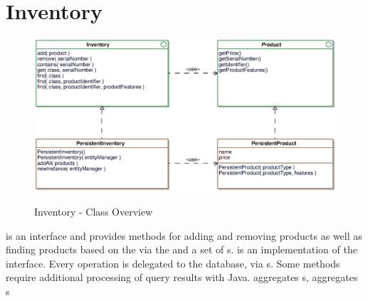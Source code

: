 \newpage
\section{Inventory}

\begin{figure}[ht]
	\centering
  \includegraphics[width=1.0\textwidth]{images/Inventory_Overview.eps}
	\label{inventory_overview}
	\caption{Inventory - Class Overview}
\end{figure}


 is an interface and provides methods for adding and removing products as well as finding products based on the  via the  and a set of s.
 is an implementation of the  interface. Every operation is delegated to the database, via s. Some methods require additional processing of query results with Java.
 aggregates s,  aggregates s 

